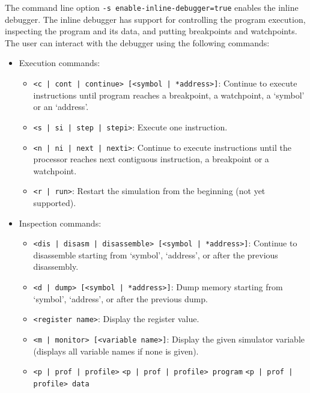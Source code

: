 The command line option \texttt{-s enable-inline-debugger=true} enables the inline debugger. The inline debugger has support for controlling the program execution, inspecting the program and its data, and putting breakpoints and watchpoints. The user can interact with the debugger using the following commands:
\begin{itemize}
\item Execution commands:
	\begin{itemize}
	\item \texttt{<c | cont | continue> [<symbol | *address>]}: \newline
	Continue to execute instructions until program reaches a breakpoint, a watchpoint, a `symbol' or an `address'.
	\item \texttt{<s | si | step | stepi>}: \newline
	Execute one instruction.
	\item \texttt{<n | ni | next | nexti>}: \newline
	Continue to execute instructions until the processor reaches next contiguous instruction, a breakpoint or a watchpoint.
	\item \texttt{<r | run>}: \newline
	Restart the simulation from the beginning (not yet supported).
	\end{itemize}
\item Inspection commands:
	\begin{itemize}
	\item \texttt{<dis | disasm | disassemble> [<symbol | *address>]}: \newline
	Continue to disassemble starting from `symbol', `address', or after the previous disassembly.
	\item \texttt{<d | dump> [<symbol | *address>]}: \newline
	Dump memory starting from `symbol', `address', or after the previous dump.
	\item \texttt{<register name>}: \newline
	Display the register value.
	\item \texttt{<m | monitor> [<variable name>]}: \newline
	Display the given simulator variable (displays all variable names if none is given).
	\item \texttt{<p | prof | profile>} \newline
	\texttt{<p | prof | profile> program} \newline
	\texttt{<p | prof | profile> data} \newline

\end{itemize}
\end{itemize}
